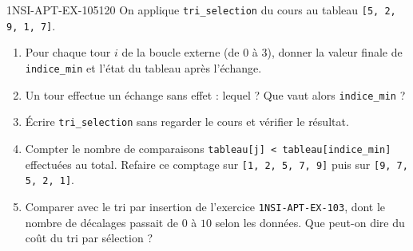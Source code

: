 \begin{exercice}{1NSI-APT-EX-105}{1}{20}
On applique \lstinline{tri_selection} du cours au tableau \lstinline{[5, 2, 9, 1, 7]}.
\begin{enumerate}
  \item Pour chaque tour $i$ de la boucle externe (de $0$ à $3$), donner la valeur finale
    de \lstinline{indice_min} et l'état du tableau après l'échange.
  \item Un tour effectue un échange sans effet : lequel ? Que vaut alors
    \lstinline{indice_min} ?
  \item Écrire \lstinline{tri_selection} sans regarder le cours et vérifier le résultat.
  \item Compter le nombre de comparaisons \lstinline{tableau[j] < tableau[indice_min]}
    effectuées au total. Refaire ce comptage sur \lstinline{[1, 2, 5, 7, 9]} puis sur
    \lstinline{[9, 7, 5, 2, 1]}.
  \item Comparer avec le tri par insertion de l'exercice \lstinline{1NSI-APT-EX-103}, dont
    le nombre de décalages passait de $0$ à $10$ selon les données. Que peut-on dire du
    coût du tri par sélection ?
\end{enumerate}
\end{exercice}
